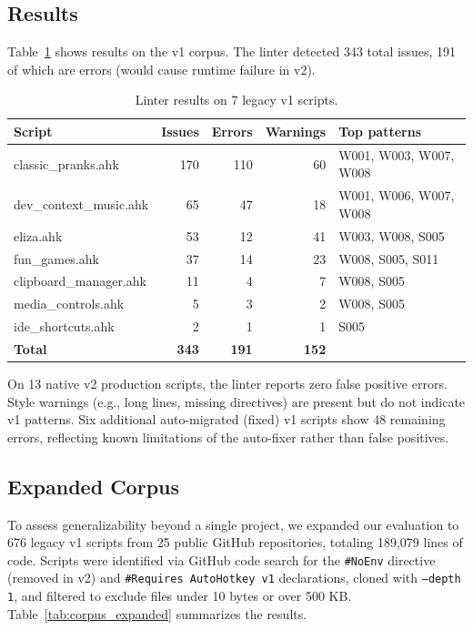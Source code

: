 \documentclass[11pt,a4paper]{article}
\begin{document}
\subsection{Results}

Table~\ref{tab:v1} shows results on the v1 corpus. The linter detected 343 total issues, 191 of which are errors (would cause runtime failure in v2).

\begin{table}[h]
\centering\small
\caption{Linter results on 7 legacy v1 scripts.}
\label{tab:v1}
\begin{tabular}{lrrrl}
\toprule
\textbf{Script} & \textbf{Issues} & \textbf{Errors} & \textbf{Warnings} & \textbf{Top patterns} \\
\midrule
classic\_pranks.ahk & 170 & 110 & 60 & W001, W003, W007, W008 \\
dev\_context\_music.ahk & 65 & 47 & 18 & W001, W006, W007, W008 \\
eliza.ahk & 53 & 12 & 41 & W003, W008, S005 \\
fun\_games.ahk & 37 & 14 & 23 & W008, S005, S011 \\
clipboard\_manager.ahk & 11 & 4 & 7 & W008, S005 \\
media\_controls.ahk & 5 & 3 & 2 & W008, S005 \\
ide\_shortcuts.ahk & 2 & 1 & 1 & S005 \\
\midrule
\textbf{Total} & \textbf{343} & \textbf{191} & \textbf{152} & \\
\bottomrule
\end{tabular}
\end{table}

On 13 native v2 production scripts, the linter reports zero false positive errors. Style warnings (e.g., long lines, missing directives) are present but do not indicate v1 patterns. Six additional auto-migrated (fixed) v1 scripts show 48 remaining errors, reflecting known limitations of the auto-fixer rather than false positives.

\subsection{Expanded Corpus}
\label{sec:expanded-corpus}

To assess generalizability beyond a single project, we expanded our evaluation to 676 legacy v1 scripts from 25 public GitHub repositories, totaling 189,079 lines of code. Scripts were identified via GitHub code search for the \texttt{\#NoEnv} directive (removed in v2) and \texttt{\#Requires AutoHotkey v1} declarations, cloned with \texttt{--depth 1}, and filtered to exclude files under 10 bytes or over 500 KB. Table~\ref{tab:corpus_expanded} summarizes the results.
\end{document}
